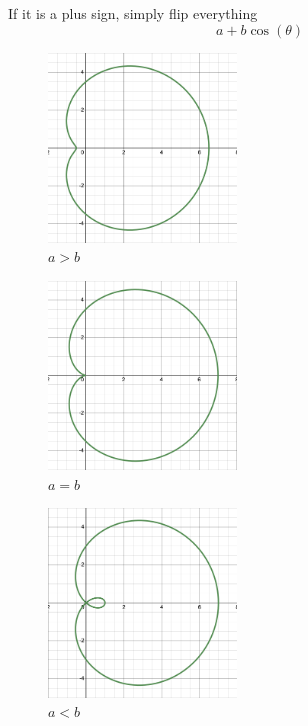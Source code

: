     \noindent If it is a plus sign, simply flip everything
    \begin{equation}
        a+b\cos{(\theta)}
    \end{equation}
    \begin{multicols}{3}
    \begin{figure}[H]
        \centering
        \includegraphics[width=5cm]{Pictures/Polar Form/BiggerReflect.png}
        \caption[]{$a>b$ \footnotemark[2]}
        \label{a>b}
    \end{figure}
    \begin{figure}[H]
        \centering
        \includegraphics[width=5cm]{Pictures/Polar Form/EqualReflect.png}
        \caption[]{$a=b$ \footnotemark[2]}
        \label{a=b}
    \end{figure}
    \begin{figure}[H]
        \centering
        \includegraphics[width=5cm]{Pictures/Polar Form/SmallerReflect.png}
        \caption[]{$a<b$ \footnotemark[2]}
        \label{a<b}
    \end{figure}
    \end{multicols}
    

